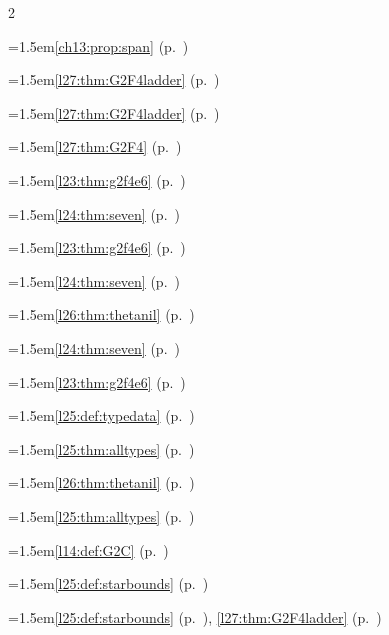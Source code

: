 \begin{multicols}{2}
\par{}\par\nopagebreak\smallskip
\hangindent=1.5em\quad \ref{ch13:prop:span} (p.~\pageref{ch13:prop:span})\par
\hangindent=1.5em\quad \ref{l27:thm:G2F4ladder} (p.~\pageref{l27:thm:G2F4ladder})\par
\hangindent=1.5em\quad \ref{l27:thm:G2F4ladder} (p.~\pageref{l27:thm:G2F4ladder})\par
\hangindent=1.5em\quad \ref{l27:thm:G2F4} (p.~\pageref{l27:thm:G2F4})\par
\hangindent=1.5em\quad \ref{l23:thm:g2f4e6} (p.~\pageref{l23:thm:g2f4e6})\par
\hangindent=1.5em\quad \ref{l24:thm:seven} (p.~\pageref{l24:thm:seven})\par
\hangindent=1.5em\quad \ref{l23:thm:g2f4e6} (p.~\pageref{l23:thm:g2f4e6})\par
\hangindent=1.5em\quad \ref{l24:thm:seven} (p.~\pageref{l24:thm:seven})\par
\hangindent=1.5em\quad \ref{l26:thm:thetanil} (p.~\pageref{l26:thm:thetanil})\par
\hangindent=1.5em\quad \ref{l24:thm:seven} (p.~\pageref{l24:thm:seven})\par
\hangindent=1.5em\quad \ref{l23:thm:g2f4e6} (p.~\pageref{l23:thm:g2f4e6})\par
\hangindent=1.5em\quad \ref{l25:def:typedata} (p.~\pageref{l25:def:typedata})\par
\hangindent=1.5em\quad \ref{l25:thm:alltypes} (p.~\pageref{l25:thm:alltypes})\par
\hangindent=1.5em\quad \ref{l26:thm:thetanil} (p.~\pageref{l26:thm:thetanil})\par
\hangindent=1.5em\quad \ref{l25:thm:alltypes} (p.~\pageref{l25:thm:alltypes})\par
\hangindent=1.5em\quad \ref{l14:def:G2C} (p.~\pageref{l14:def:G2C})\par
\hangindent=1.5em\quad \ref{l25:def:starbounds} (p.~\pageref{l25:def:starbounds})\par
\hangindent=1.5em\quad \ref{l25:def:starbounds} (p.~\pageref{l25:def:starbounds}), \ref{l27:thm:G2F4ladder} (p.~\pageref{l27:thm:G2F4ladder})\par

\end{multicols}
